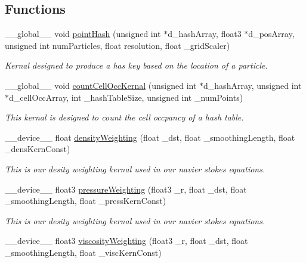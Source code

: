 \subsection*{Functions}
\begin{DoxyCompactItemize}
\item 
\-\_\-\-\_\-global\-\_\-\-\_\- void \hyperlink{_cuda_s_p_h_kernals_8cu_afdcbd8ca539116cc7b8d030b1e418e77}{point\-Hash} (unsigned int $\ast$d\-\_\-hash\-Array, float3 $\ast$d\-\_\-pos\-Array, unsigned int num\-Particles, float resolution, float \-\_\-grid\-Scaler)
\begin{DoxyCompactList}\small\item\em Kernal designed to produce a has key based on the location of a particle. \end{DoxyCompactList}\item 
\-\_\-\-\_\-global\-\_\-\-\_\- void \hyperlink{_cuda_s_p_h_kernals_8cu_ad805b6eb0d36394de57c25b3d06718ca}{count\-Cell\-Occ\-Kernal} (unsigned int $\ast$d\-\_\-hash\-Array, unsigned int $\ast$d\-\_\-cell\-Occ\-Array, int \-\_\-hash\-Table\-Size, unsigned int \-\_\-num\-Points)
\begin{DoxyCompactList}\small\item\em This kernal is designed to count the cell occpancy of a hash table. \end{DoxyCompactList}\item 
\-\_\-\-\_\-device\-\_\-\-\_\- float \hyperlink{_cuda_s_p_h_kernals_8cu_aaaee82afeb737d25fb86efb6949aa1b5}{density\-Weighting} (float \-\_\-dst, float \-\_\-smoothing\-Length, float \-\_\-dens\-Kern\-Const)
\begin{DoxyCompactList}\small\item\em This is our desity weighting kernal used in our navier stokes equations. \end{DoxyCompactList}\item 
\-\_\-\-\_\-device\-\_\-\-\_\- float3 \hyperlink{_cuda_s_p_h_kernals_8cu_ad44155cc5df4e6c30367f437d6fcb489}{pressure\-Weighting} (float3 \-\_\-r, float \-\_\-dst, float \-\_\-smoothing\-Length, float \-\_\-press\-Kern\-Const)
\begin{DoxyCompactList}\small\item\em This is our desity weighting kernal used in our navier stokes equations. \end{DoxyCompactList}\item 
\-\_\-\-\_\-device\-\_\-\-\_\- float3 \hyperlink{_cuda_s_p_h_kernals_8cu_ad682f881cf72f537f3cad1ba7993b5b5}{viscosity\-Weighting} (float3 \-\_\-r, float \-\_\-dst, float \-\_\-smoothing\-Length, float \-\_\-visc\-Kern\-Const)

\end{DoxyCompactItemize}
